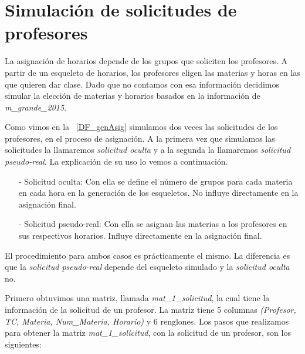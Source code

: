 \section{Simulación de solicitudes de profesores} \label{SimSolicitudesProfesores}

La asignación de horarios depende de los grupos que soliciten los profesores. A partir de un esqueleto de horarios, los profesores eligen las materias y horas en las que quieren dar clase. Dado que no contamos con esa información decidimos simular la elección de materias y horarios basados en la información de \textit{m\_grande\_2015}.

Como vimos en la \figurename{~\ref{DF_genAsig}} simulamos dos veces las solicitudes de los profesores, en el proceso de asignación. A la primera vez que simulamos las solicitudes la llamaremos \textit{solicitud oculta} y a la segunda la llamaremos \textit{solicitud pseudo-real}. La explicación de su uso lo vemos a continuación.

\begin{itemize}
\item[-] Solicitud oculta: Con ella se define el número de grupos para cada materia en cada hora en la generación de los esqueletos. No influye directamente en la asignación final.

\item[-] Solicitud pseudo-real: Con ella se asignan las materias a los profesores en sus respectivos horarios. Influye directamente en la asignación final.
\end{itemize}

El procedimiento para ambos casos es prácticamente el mismo. La diferencia es que la \textit{solicitud pseudo-real} depende del esqueleto simulado y la \textit{solicitud oculta} no.

Primero obtuvimos una matriz, llamada \textit{mat\_1\_solicitud}, la cual tiene la información de la solicitud de un profesor. La matriz tiene 5 columnas \textit{(Profesor, TC, Materia, Num\_Materia, Horario)} y 6 renglones. Los pasos que realizamos para obtener la matriz \textit{mat\_1\_solicitud}, con la solicitud de un profesor, son los siguientes:

